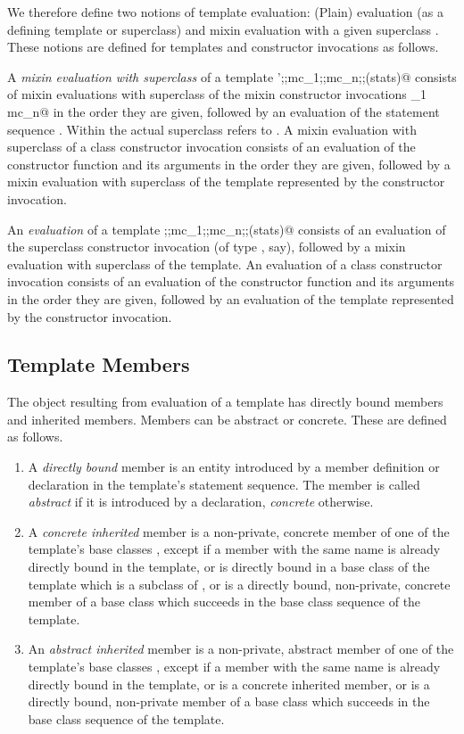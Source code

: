 \documentclass[11pt]{report}
\newcommand{\ifqualified}[1]{}
\begin{document}
We therefore define two notions of template evaluation: (Plain)
evaluation (as a defining template or superclass) and mixin evaluation
with a given superclass \verb@sc@. These notions are defined for templates
and constructor invocations as follows.

A {\em mixin evaluation with superclass \verb@sc@} of a template
\verb@sc';\WITH;mc_1;\WITH;mc_n;\WITH;(stats)@ consists of mixin
evaluations with superclass \verb@sc@ of the mixin constructor invocations
\verb@mc_1 \commadots mc_n@ in the order they are given, followed by an
evaluation of the statement sequence \verb@stats@.  Within \verb@stats@ the
actual superclass refers to \verb@sc@.  A mixin evaluation with superclass
\verb@sc@ of a class constructor invocation \verb@ci@ consists of an evaluation
of the constructor function and its arguments in the order they are
given, followed by a mixin evaluation with superclass \verb@sc@ of the
template represented by the constructor invocation.

An {\em evaluation} of a template
\verb@sc;\WITH;mc_1;\WITH;mc_n;\WITH;(stats)@ consists of an evaluation of
the superclass constructor invocation \verb@sc@ (of type \verb@S@, say),
followed by a mixin evaluation with superclass \verb@sc@ of the template. An
evaluation of a class constructor invocation \verb@ci@ consists of an
evaluation of the constructor function and its arguments in
the order they are given, followed by an evaluation of the template
represented by the constructor invocation.

\subsection{Template Members}

\label{sec:members}

The object resulting from evaluation of a template has directly bound
members and inherited members. Members can be abstract or concrete.
These are defined as follows.
\begin{enumerate}
\item
A {\em directly bound} member is an entity introduced by a member
definition or declaration in the template's statement sequence. The
member is called {\em abstract} if it is introduced by a declaration,
{\em concrete} otherwise.
\item
A {\em concrete inherited} member is a non-private, concrete member of
one of the template's base classes \verb@B@, except if a member with the
same \ifqualified{qualified} name is already directly bound in the template, or is
directly bound in a base class of the template which is a subclass of
\verb@B@, or is a directly bound, non-private, concrete member of a base
class which succeeds \verb@B@ in the base class sequence of the template.
\item
An {\em abstract inherited} member is a non-private, abstract member
of one of the template's base classes \verb@B@, except if a member with the
same \ifqualified{qualified} name is already directly bound in the template, or is a
concrete inherited member, or is a directly bound, non-private member
of a base class which succeeds \verb@b@ in the base class sequence of the
template.
\end{enumerate}
\end{document}

